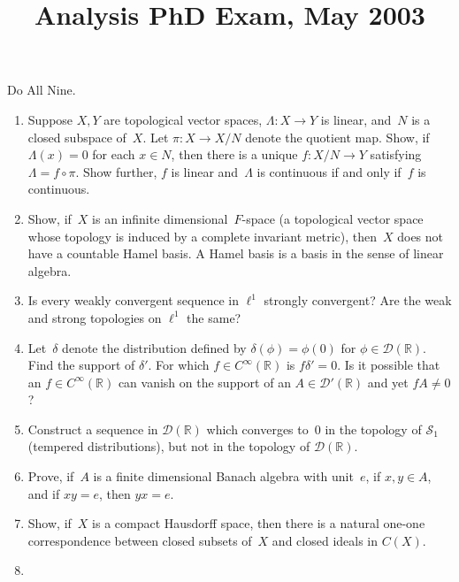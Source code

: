 \documentclass[11pt,letterpaper]{article}
\title{Analysis PhD Exam, May 2003}
\author{}
\date{}
\newenvironment{examproblems}[2]{%
  \def\ProblemHeadingTag{#2}%
  \AssignTaggingSocketPlug{block/list/label}{examproblem}%
  \begin{enumerate}%
  \setcounter{enumi}{#1}%
  \renewcommand{\labelenumi}{\textbf{\theenumi.}}%
  \setlength{\topsep}{0.35em}%
  \setlength{\partopsep}{0pt}%
  \setlength{\itemsep}{0.48em}%
  \setlength{\parsep}{0.18em}%
}{\end{enumerate}}
\newenvironment{examinstructions}{%
  \par\begingroup\itshape
}{%
  \par\endgroup\vspace{0.18em}
}
\begin{document}
\maketitle
\thispagestyle{empty}
\begin{examinstructions}
Do All Nine.
\end{examinstructions}
\begin{examproblems}{0}{H2}
\def\ProblemHeadingText{Problem 1.}
\item
Suppose \(X,Y\) are topological vector spaces, \(\Lambda:X\to Y\) is linear, and~\(N\) is a closed subspace of~\(X\). Let \(\pi:X\to X/N\) denote the quotient map. Show, if \(\Lambda(x)=0\) for each \(x\in N\), then there is a unique \(f:X/N\to Y\) satisfying \(\Lambda=f\circ\pi\). Show further, \(f\) is linear and~\(\Lambda\) is continuous if and only if~\(f\) is continuous.
\def\ProblemHeadingText{Problem 2.}
\item
Show, if~\(X\) is an infinite dimensional~\(F\)-space (a topological vector space whose topology is induced by a complete invariant metric), then~\(X\) does not have a countable Hamel basis. A Hamel basis is a basis in the sense of linear algebra.
\def\ProblemHeadingText{Problem 3.}
\item
Is every weakly convergent sequence in \(\ell^1\) strongly convergent? Are the weak and strong topologies on \(\ell^1\) the same?
\def\ProblemHeadingText{Problem 4.}
\item
Let~\(\delta\) denote the distribution defined by \(\delta(\phi)=\phi(0)\) for \(\phi\in\mathcal D(\mathbb R)\). Find the support of \(\delta'\). For which \(f\in C^\infty(\mathbb R)\) is \(f\delta'=0\). Is it possible that an \(f\in C^\infty(\mathbb R)\) can vanish on the support of an \(A\in\mathcal D'(\mathbb R)\) and yet \(fA\ne0\)?
\def\ProblemHeadingText{Problem 5.}
\item
Construct a sequence in \(\mathcal D(\mathbb R)\) which converges to~\(0\) in the topology of \(\mathcal S_1\) (tempered distributions), but not in the topology of \(\mathcal D(\mathbb R)\).
\def\ProblemHeadingText{Problem 6.}
\item
Prove, if~\(A\) is a finite dimensional Banach algebra with unit~\(e\), if \(x,y\in A\), and if \(xy=e\), then \(yx=e\).
\def\ProblemHeadingText{Problem 7.}
\item
Show, if~\(X\) is a compact Hausdorff space, then there is a natural one-one correspondence between closed subsets of~\(X\) and closed ideals in \(C(X)\).
\def\ProblemHeadingText{Problem 8.}
\item

\end{examproblems}
\end{document}
